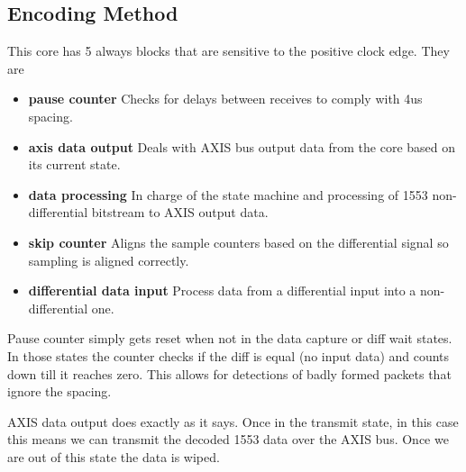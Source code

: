 \subsection{Encoding Method}
\par
This core has 5 always blocks that are sensitive to the positive clock edge. They are

\begin{itemize}
\item \textbf{pause counter} Checks for delays between receives to comply with 4us spacing.
\item \textbf{axis data output} Deals with AXIS bus output data from the core based on its current state.
\item \textbf{data processing} In charge of the state machine and processing of 1553 non-differential bitstream to AXIS output data.
\item \textbf{skip counter} Aligns the sample counters based on the differential signal so sampling is aligned correctly.
\item \textbf{differential data input} Process data from a differential input into a non-differential one.
\end{itemize}

\par
Pause counter simply gets reset when not in the data capture or diff wait states. In those states the counter checks if the diff is equal (no input data) and counts down
till it reaches zero. This allows for detections of badly formed packets that ignore the spacing.

\par
AXIS data output does exactly as it says. Once in the transmit state, in this case this means we can transmit the decoded 1553 data over the AXIS bus. Once we are out of this state
the data is wiped.

